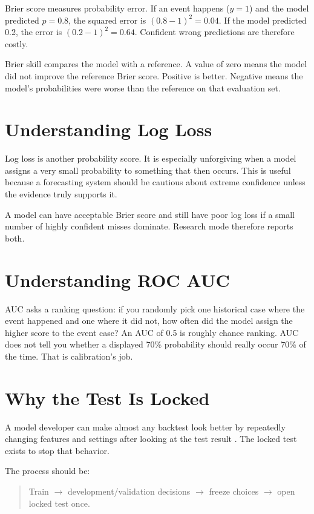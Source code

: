 \documentclass[11pt]{article}
\begin{document}
Brier score measures probability error. If an event happens ($y=1$) and the model predicted $p=0.8$, the squared error is $(0.8-1)^2=0.04$. If the model predicted 0.2, the error is $(0.2-1)^2=0.64$. Confident wrong predictions are therefore costly.

Brier skill compares the model with a reference. A value of zero means the model did not improve the reference Brier score. Positive is better. Negative means the model's probabilities were worse than the reference on that evaluation set.

\section{Understanding Log Loss}
Log loss is another probability score. It is especially unforgiving when a model assigns a very small probability to something that then occurs. This is useful because a forecasting system should be cautious about extreme confidence unless the evidence truly supports it.

A model can have acceptable Brier score and still have poor log loss if a small number of highly confident misses dominate. Research mode therefore reports both.

\section{Understanding ROC AUC}
AUC asks a ranking question: if you randomly pick one historical case where the event happened and one where it did not, how often did the model assign the higher score to the event case? An AUC of 0.5 is roughly chance ranking. AUC does not tell you whether a displayed 70\% probability should really occur 70\% of the time. That is calibration's job.

\section{Why the Test Is Locked}
A model developer can make almost any backtest look better by repeatedly changing features and settings after looking at the test result \citep{white2000reality,harvey2016crosssection,bailey2017pbo}. The locked test exists to stop that behavior.

The process should be:
\begin{quote}
Train $\rightarrow$ development/validation decisions $\rightarrow$ freeze choices $\rightarrow$ open locked test once.
\end{quote}
\end{document}
